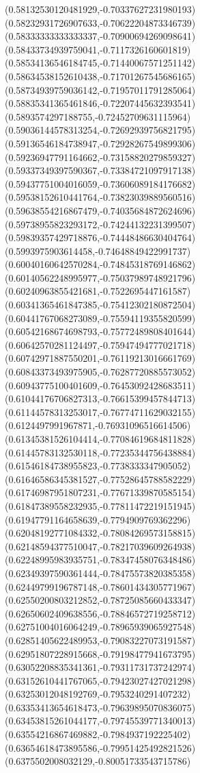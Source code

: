 \documentclass[12pt]{article}
\theoremstyle{plain}
\theoremstyle{definition}
\theoremstyle{remark}
\begin{document}
\begin{figure}
{  (0.58132530120481929,-0.70337627231980193)%
  (0.58232931726907633,-0.70622204873346739)%
  (0.58333333333333337,-0.70900694269098641)%
  (0.58433734939759041,-0.7117326160601819)%
  (0.58534136546184745,-0.71440067571251142)%
  (0.58634538152610438,-0.71701267545686165)%
  (0.58734939759036142,-0.71957011791285064)%
  (0.58835341365461846,-0.72207445632393541)%
  (0.5893574297188755,-0.72452709631115964)%
  (0.59036144578313254,-0.72692939756821795)%
  (0.59136546184738947,-0.72928267549899306)%
  (0.59236947791164662,-0.73158820279859327)%
  (0.59337349397590367,-0.73384721097917138)%
  (0.59437751004016059,-0.73606089184176682)%
  (0.59538152610441764,-0.73823039889560516)%
  (0.59638554216867479,-0.74035684872624696)%
  (0.59738955823293172,-0.74244132231399507)%
  (0.59839357429718876,-0.74448486630404764)%
  (0.5993975903614458,-0.74648849422991737)%
  (0.60040160642570284,-0.74845318769146862)%
  (0.60140562248995977,-0.75037989748921796)%
  (0.60240963855421681,-0.7522695447161587)%
  (0.60341365461847385,-0.75412302180872504)%
  (0.60441767068273089,-0.75594119355820599)%
  (0.60542168674698793,-0.75772489808401644)%
  (0.60642570281124497,-0.75947494777021718)%
  (0.60742971887550201,-0.76119213016661769)%
  (0.60843373493975905,-0.76287720885573052)%
  (0.60943775100401609,-0.76453092428683511)%
  (0.61044176706827313,-0.76615399457844713)%
  (0.61144578313253017,-0.76774711629032155)%
  (0.6124497991967871,-0.76931096516614506)%
  (0.61345381526104414,-0.77084619684811828)%
  (0.61445783132530118,-0.77235344756438884)%
  (0.61546184738955823,-0.7738333347905052)%
  (0.61646586345381527,-0.77528645788582229)%
  (0.61746987951807231,-0.77671339870585154)%
  (0.61847389558232935,-0.77811472219151945)%
  (0.61947791164658639,-0.7794909769362296)%
  (0.62048192771084332,-0.78084269573158815)%
  (0.62148594377510047,-0.78217039609264938)%
  (0.62248995983935751,-0.78347458076348486)%
  (0.62349397590361444,-0.78475573820385358)%
  (0.62449799196787148,-0.78601434305771967)%
  (0.62550200803212852,-0.78725085660433347)%
  (0.62650602409638556,-0.78846572719258712)%
  (0.62751004016064249,-0.78965939065927548)%
  (0.62851405622489953,-0.79083227073191587)%
  (0.62951807228915668,-0.79198477941673795)%
  (0.63052208835341361,-0.79311731737242974)%
  (0.63152610441767065,-0.79423027427021298)%
  (0.63253012048192769,-0.7953240291407232)%
  (0.63353413654618473,-0.79639895070836075)%
  (0.63453815261044177,-0.79745539771340013)%
  (0.63554216867469882,-0.7984937192225402)%
  (0.63654618473895586,-0.79951425492821526)%
  (0.6375502008032129,-0.80051733543715786)%
}
\end{figure}
\end{document}
